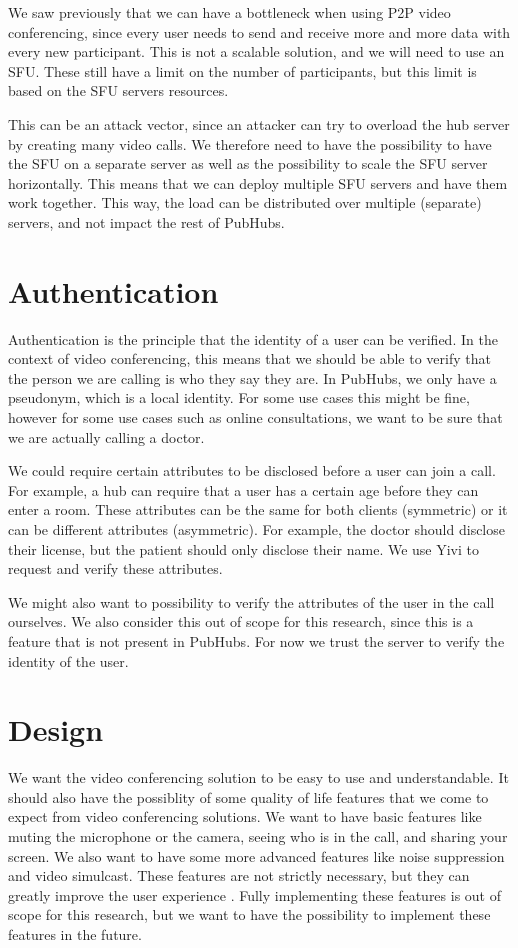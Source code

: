 \documentclass{report}
\begin{document}
We saw previously that we can have a bottleneck when using P2P video conferencing, since every user needs to send
and receive more and more data with every new participant. This is not a scalable solution, and we will need to use
an SFU. These still have a limit on the number of participants, but this limit is based on the SFU servers resources.

This can be an attack vector, since an attacker can try to overload the hub server by creating many video calls. We
therefore need to have the possibility to have the SFU on a separate server as well as the possibility to scale the SFU
server horizontally. This means that we can deploy multiple SFU servers and have them work together.
This way, the load can be distributed over multiple (separate) servers, and not impact the rest of PubHubs.

\section{Authentication}
Authentication is the principle that the identity of a user can be verified. In the context of video conferencing,
this means that we should be able to verify that the person we are calling is who they say they are. In PubHubs, we
only have a pseudonym, which is a local identity. For some use cases this might be fine, however for some use cases
such as online consultations, we want to be sure that we are actually calling a doctor.

We could require certain attributes to be disclosed before a user can join a call. For example, a hub
can require that a user has a certain age before they can enter a room. These attributes can be the same for both
clients (symmetric) or it can be different attributes (asymmetric). For example, the doctor should disclose their license, but the patient should only
disclose their name. We use Yivi to request and verify these attributes.

We might also want to possibility to verify the attributes of the user in the call ourselves. We also consider this out
of scope for this research, since this is a feature that is not present in PubHubs. For now we trust the server to
verify the identity of the user.

\section{Design}
We want the video conferencing solution to be easy to use and understandable. It should also have the possiblity of
some quality of life features that we come to expect from video conferencing solutions. We want to have basic
features like muting the microphone or the camera, seeing who is in the call, and sharing your screen. We also want
to have some more advanced features like noise suppression and video simulcast. These features are not strictly
necessary, but they can greatly improve the user experience \cite{skowronek_quality_2022}.
Fully implementing these features is out of scope for this research, but we want to have the possibility to implement
these features in the future.
\end{document}
